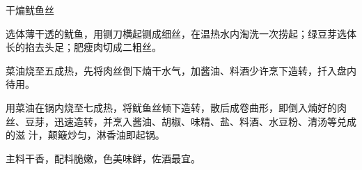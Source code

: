 \begin{recipe}{干煸鱿鱼丝}

\ingredients


\preparation

\step 选体薄干透的鱿鱼，用铡刀横起铡成细丝，在温热水内淘洗一次捞起；绿豆芽选体
长的掐去头足；肥瘦肉切成二粗丝。

\step 菜油烧至五成热，先将肉丝倒下煵干水气，加酱油、料酒少许烹下造转，扦入盘内
待用。

\step 用菜油在锅内烧至七成热，将鱿鱼丝倾下造转，散后成卷曲形，即倒入煵好的肉
丝、豆芽，迅速造转，并烹入酱油、胡椒、味精、盐、料酒、水豆粉、清汤等兑成的滋
汁，颠簸炒匀，淋香油即起锅。

\features

主料干香，配料脆嫩，色美味鲜，佐酒最宜。

\end{recipe}

